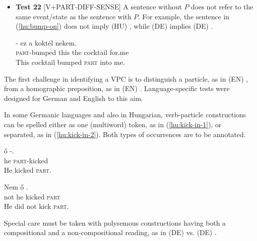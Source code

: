 \documentclass[output=paper,modfonts]{langscibook}
\begin{document}
\begin{itemize}
\item[] \textbf{Test 22} [V+PART-DIFF-SENSE] A sentence without $P$ does not refer to the same event/state as the sentence with $P$.  For example, the sentence in (\ref{hu:bump-on})
does not imply (HU) , while (DE)  implies (DE) . 


\ea \label{hu:bump-on}
\settowidth {}
\gll  {}- ez a koktél nekem. \\
\textsc{part}-bumped this the cocktail for.me\\ 
\glt This cocktail bumped \textsc{part} into me. 
\z

\end{itemize}

The first challenge in identifying a VPC is to distinguish a particle, as in (EN) ,  from a homographic preposition, as in (EN) . Language-specific tests were designed for German and English to this aim.

In some Germanic languages and also in Hungarian, verb-particle constructions can be spelled either as one (multiword) token, as in (\ref{hu:kick-in-1}), 
or separated, as in (\ref{hu:kick-in-2}). %
Both types of occurrences are to be annotated.


\ea \label{hu:kick-in-1}
\settowidth {}
\gll  ő -. \\
he \textsc{part}-kicked\\ 
\glt He kicked \textsc{part}. 
\z

\ea \label{hu:kick-in-2}
\settowidth {}
\gll Nem ő  . \\
not he kicked \textsc{part}\\ 
\glt He did not kick \textsc{part}. 
\z

Special care must be taken with polysemous constructions having both a compositional and a non-compositional reading, as in (DE)   vs. (DE) .
\end{document}
